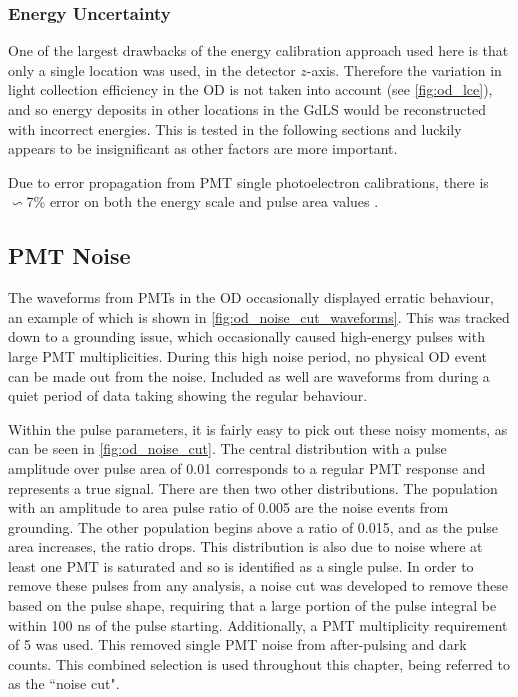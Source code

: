 \subsubsection{Energy Uncertainty}
\par
One of the largest drawbacks of the energy calibration approach used here is that only a single location was used, in the detector $z$-axis.
Therefore the variation in light collection efficiency in the OD is not taken into account (see \autoref{fig:od_lce}), and so energy deposits in other locations in the GdLS would be reconstructed with incorrect energies.
This is tested in the following sections and luckily appears to be insignificant as other factors are more important.
\par
Due to error propagation from PMT single photoelectron calibrations, there is $\backsim$7\% error on both the energy scale and pulse area values \cite{ewanfraser_thesis_ref}.


\subsection{PMT Noise}
\par
The waveforms from PMTs in the OD occasionally displayed erratic behaviour, an example of which is shown in \autoref{fig:od_noise_cut_waveforms}.
This was tracked down to a grounding issue, which occasionally caused high-energy pulses with large PMT multiplicities.
During this high noise period, no physical OD event can be made out from the noise.
Included as well are waveforms from during a quiet period of data taking showing the regular behaviour.
\par
Within the pulse parameters, it is fairly easy to pick out these noisy moments, as can be seen in \autoref{fig:od_noise_cut}.
The central distribution with a pulse amplitude over pulse area of 0.01 corresponds to a regular PMT response and represents a true signal.
There are then two other distributions.
The population with an amplitude to area pulse ratio of 0.005 are the noise events from grounding.
The other population begins above a ratio of 0.015, and as the pulse area increases, the ratio drops.
This distribution is also due to noise where at least one PMT is saturated and so is identified as a single pulse.
In order to remove these pulses from any analysis, a noise cut was developed to remove these based on the pulse shape, requiring that a large portion of the pulse integral be within 100 ns of the pulse starting.
Additionally, a PMT multiplicity requirement of 5 was used.
This removed single PMT noise from after-pulsing and dark counts.
This combined selection is used throughout this chapter, being referred to as the ``noise cut".


